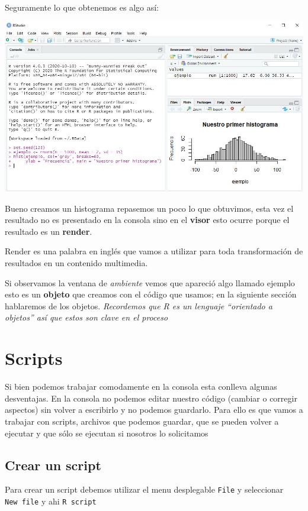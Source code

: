 \documentclass[
]{book}
\begin{document}
Seguramente lo que obtenemos es algo así:

\includegraphics[width=13.71in]{img/Rstudiofig2}

Bueno creamos un histograma repasemos un poco lo que obtuvimos, esta vez el resultado no es presentado en la consola sino en el \textbf{visor} esto ocurre porque el resultado es un \textbf{render}.

Render es una palabra en inglés que vamos a utilizar para toda transformación de resultados en un contenido multimedia.

Si observamos la ventana de \emph{ambiente} vemos que apareció algo llamado ejemplo esto es un \textbf{objeto} que creamos con el código que usamos; en la siguiente sección hablaremos de los objetos. \emph{Recordemos que R es un lenguaje ``orientado a objetos'' así que estos son clave en el proceso}

\hypertarget{scripts}{%
\section{Scripts}\label{scripts}}

Si bien podemos trabajar comodamente en la consola esta conlleva algunas desventajas. En la consola no podemos editar nuestro código (cambiar o corregir aspectos) sin volver a escribirlo y no podemos guardarlo.
Para ello es que vamos a trabajar con scripts, archivos que podemos guardar, que se pueden volver a ejecutar y que sólo se ejecutan si nosotros lo solicitamos

\hypertarget{crear-un-script}{%
\subsection{Crear un script}\label{crear-un-script}}

Para crear un script debemos utilizar el menu desplegable \texttt{File} y seleccionar \texttt{New\ file} y ahi \texttt{R\ script}
\end{document}
